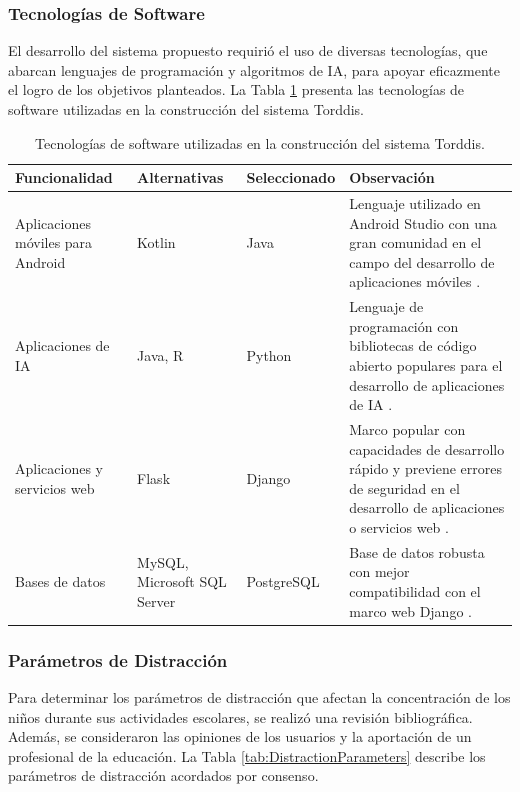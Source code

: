 				\subsubsection*{Tecnologías de Software}
					El desarrollo del sistema propuesto requirió el uso de diversas tecnologías, que abarcan lenguajes de programación y algoritmos de IA, para apoyar eficazmente el logro de los objetivos planteados. La Tabla \ref{table:software-technologies} presenta las tecnologías de software utilizadas en la construcción del sistema Torddis.
				
					\begin{table}[hbt]
						\caption{Tecnologías de software utilizadas en la construcción del sistema Torddis.}
						\label{table:software-technologies}
						\centering
						\begin{tabular}{p{}p{0.15\textwidth}p{}p{}}
							\hline
							\multicolumn{1}{l}{\textbf{Funcionalidad}} & \multicolumn{1}{l}{\textbf{Alternativas }} & \multicolumn{1}{l}{\textbf{Seleccionado}} & \multicolumn{1}{l}{\textbf{Observación}} \\ \hline
							Aplicaciones móviles para Android & Kotlin & Java & Lenguaje utilizado en Android Studio con una gran comunidad en el campo del desarrollo de aplicaciones móviles \citep{Sharma2021Real-Time}. \\
							Aplicaciones de IA & Java, R & Python & Lenguaje de programación con bibliotecas de código abierto populares para el desarrollo de aplicaciones de IA \citep{Cai2005OnThePerformance}. \\
							Aplicaciones y servicios web & Flask & Django & Marco popular con capacidades de desarrollo rápido y previene errores de seguridad en el desarrollo de aplicaciones o servicios web \citep{Puneet2022ADjango}. \\
							Bases de datos & MySQL, Microsoft SQL Server & PostgreSQL & Base de datos robusta con mejor compatibilidad con el marco web Django \citep{Puneet2022ADjango}. \\ \hline
						\end{tabular}
					\end{table}
				
				\subsubsection*{Parámetros de Distracción}
					Para determinar los parámetros de distracción que afectan la concentración de los niños durante sus actividades escolares, se realizó una revisión bibliográfica. Además, se consideraron las opiniones de los usuarios y la aportación de un profesional de la educación. La Tabla \ref{tab:DistractionParameters} describe los parámetros de distracción acordados por consenso.
					
